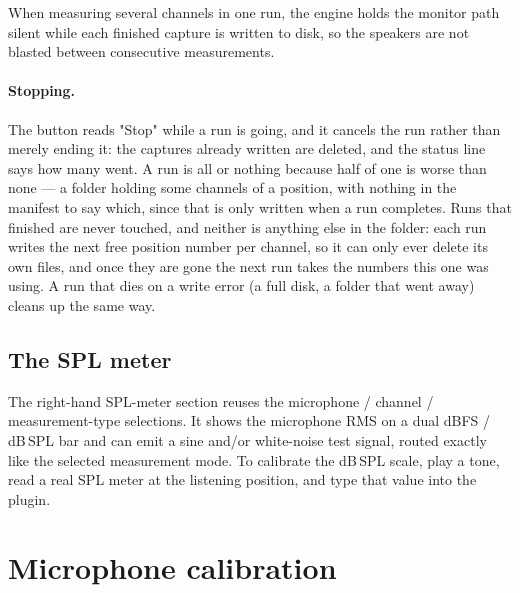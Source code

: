 When measuring several channels in one run, the engine holds the monitor path silent while each finished capture is written to disk, so the speakers are not blasted between consecutive measurements.

\paragraph{Stopping.} The button reads "Stop" while a run is going, and it cancels the run rather than merely ending it: the captures already written are deleted, and the status line says how many went. A run is all or nothing because half of one is worse than none --- a folder holding some channels of a position, with nothing in the manifest to say which, since that is only written when a run completes. Runs that finished are never touched, and neither is anything else in the folder: each run writes the next free position number per channel, so it can only ever delete its own files, and once they are gone the next run takes the numbers this one was using. A run that dies on a write error (a full disk, a folder that went away) cleans up the same way.

\subsection{The SPL meter}\label{sec:splmeter}
The right-hand SPL-meter section reuses the microphone / channel / measurement-type selections. It shows the microphone RMS on a dual dBFS / dB\,SPL bar and can emit a sine and/or white-noise test signal, routed exactly like the selected measurement mode. To calibrate the dB\,SPL scale, play a tone, read a real SPL meter at the listening position, and type that value into the plugin.

\section{Microphone calibration}\label{sec:miccal}

